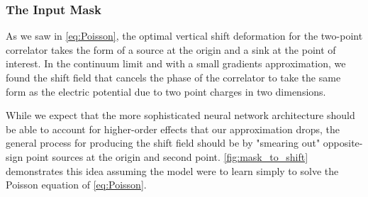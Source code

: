 \documentclass[12pt]{article}
\begin{document}
\subsubsection{The Input Mask}

As we saw in \ref{eq:Poisson}, the optimal vertical shift deformation for the two-point correlator takes the form of a source at the origin and
a sink at the point of interest. In the continuum limit and with a small gradients approximation, we found the shift field that cancels the phase of
the correlator to take the same form as the electric potential due to two point charges in two dimensions. 

While we expect that the more sophisticated neural network architecture should be able to account for higher-order effects that our approximation drops, 
the general process for producing the shift field should be by "smearing out" opposite-sign point sources at the origin and second point. \ref{fig:mask_to_shift} 
demonstrates this idea assuming the model were to learn simply to solve the Poisson equation of \ref{eq:Poisson}. 
\end{document}
